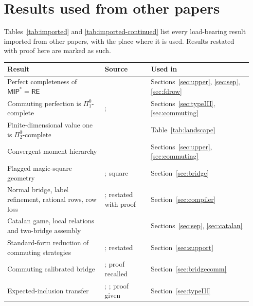 \section{Results used from other papers}\label{app:companions}
Tables~\ref{tab:imported} and \ref{tab:imported-continued} list every load-bearing result imported from other papers, with the place where it is used. Results restated with proof here are marked as such.


\begin{center}\footnotesize

\begin{minipage}{\linewidth}
\label{tab:imported}
\begin{tabular}{@{}>{\raggedright\arraybackslash}p{.40\linewidth}>{\raggedright\arraybackslash}p{.27\linewidth}>{\raggedright\arraybackslash}p{.25\linewidth}@{}}
\toprule Result & Source & Used in\\\midrule
Perfect completeness of $\mathsf{MIP}^*=\mathsf{RE}$ & \cite[Theorem~12.6]{MIPRE} & Sections~\ref{sec:upper}, \ref{sec:sep}, \ref{sec:fdrow}\\
Commuting perfection is $\Pi^0_1$-complete & \cite{Slofstra}; \cite[Theorem~6.4]{MNY} & Sections~\ref{sec:typeIII}, \ref{sec:commuting}\\
Finite-dimensional value one is $\Pi^0_2$-complete & \cite[Theorem~6.9]{MNY} & Table~\ref{tab:landscape}\\
Convergent moment hierarchy & \cite{NPA} & Sections~\ref{sec:upper}, \ref{sec:commuting}\\
Flagged magic-square geometry & \cite{Mancinska}; square \cite{Mermin,Peres} & Section~\ref{sec:bridge}\\
Normal bridge, label refinement, rational rows, row loss & \cite[Lemmas~4.1, 4.2, Theorem~B, Eq.~(32)]{Entropy}; restated with proof & Section~\ref{sec:compiler}\\
Catalan game, local relations and two-bridge assembly & \cite[Theorem~C, Sections~3 and 6, Lemma~3.1]{Entropy} & Sections~\ref{sec:sep}, \ref{sec:catalan}\\
Standard-form reduction of commuting strategies & \cite[Lemma~1.6]{ReadType}; restated & Section~\ref{sec:support}\\
Commuting calibrated bridge & \cite[Lemma~2.2]{ReadType}; proof recalled & Section~\ref{sec:bridgecomm}\\
Expected-inclusion transfer & \cite{Takesaki}; \cite[Lemma~3.1]{ReadType}; proof given & Section~\ref{sec:typeIII}\\

\end{tabular}
\end{minipage}
\end{center}
